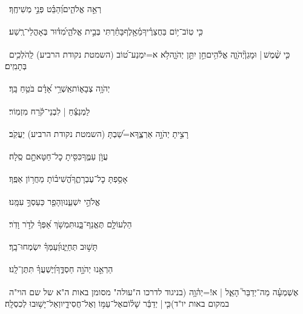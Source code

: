 \documentclass[12pt]{article}
\newcommand{\loc}[1]{\textsuperscript{\locf{#1}}}
\begin{document}
{\loc{ י}~}‏ רְאֵ֣ה אֱלֹהִ֑ים{\hfill}וְ֝הַבֵּ֗ט פְּנֵ֣י מְשִׁיחֶֽךָ׃\par

{\loc{ יא}~}‏כִּ֤י טֽוֹב־י֥וֹם בַּחֲצֵרֶ֗יךָ{\hfill}מֵ֫אָ֥לֶף\newline\hspace*{.5em}בָּחַ֗רְתִּי  בְּבֵ֣ית אֱלֹהַ֑י{\hfill}מִ֝דּ֗וּר בְּאָהֳלֵי־רֶֽשַׁע׃\par

{\loc{ יב}~}‏כִּ֤י שֶׁ֨מֶשׁ |  וּמָגֵן֮{\hfill}יְהֹוָ֢ה אֱלֹ֫הִ֥ים\newline\hspace*{.5em}חֵ֣ן  יִתֵּ֣ן יְהֹוָ֑ה{\hfill}לֹ֥א א=יִמְנַע־ט֝וֹב (השמטת נקודת הרביע) לַֽהֹלְכִ֥ים בְּתָמִֽים׃\par

{\loc{ יג}~}‏יְהֹוָ֥ה צְבָא֑וֹת{\hfill}אַֽשְׁרֵ֥י אָ֝דָ֗ם בֹּטֵ֥חַ בָּֽךְ׃\par\pend
\ledpb
\pstart[\subsection*{\textcolor{red}{פרק פה}}]\label{פרק פה}
{\loc{ א}~}‏לַמְנַצֵּ֬חַ | לִבְנֵי־קֹ֬רַח מִזְמֽוֹר׃\par

{\loc{ ב}~}‏רָצִ֣יתָ יְהֹוָ֣ה אַרְצֶ֑ךָ{\hfill}א=שַׁ֝בְתָּ (השמטת נקודת הרביע)  יַעֲקֹֽב׃\par

{\loc{ ג}~}‏ עֲוֺ֣ן עַמֶּ֑ךָ{\hfill}כִּסִּ֖יתָ כׇל־חַטָּאתָ֣ם סֶֽלָה׃\par

{\loc{ ד}~}‏אָסַ֥פְתָּ כׇל־עֶבְרָתֶ֑ךָ{\hfill}הֱ֝שִׁיב֗וֹתָ מֵחֲר֥וֹן אַפֶּֽךָ׃\par

{\loc{ ה}~}‏ אֱלֹהֵ֣י יִשְׁעֵ֑נוּ{\hfill}וְהָפֵ֖ר כַּעַסְךָ֣ עִמָּֽנוּ׃\par

{\loc{ ו}~}‏הַלְעוֹלָ֥ם תֶּאֱנַף־בָּ֑נוּ{\hfill}תִּמְשֹׁ֥ךְ אַ֝פְּךָ֗ לְדֹ֣ר וָדֹֽר׃\par

{\loc{ ז}~}‏ תָּשׁ֣וּב תְּחַיֵּ֑נוּ{\hfill}וְ֝עַמְּךָ֗ יִשְׂמְחוּ־בָֽךְ׃\par

{\loc{ ח}~}‏הַרְאֵ֣נוּ יְהֹוָ֣ה חַסְדֶּ֑ךָ{\hfill}וְ֝יֶשְׁעֲךָ֗ תִּתֶּן־לָֽנוּ׃\par

{\loc{ ט}~}‏אֶשְׁמְעָ֗ה מַה־יְדַבֵּר֮ הָאֵ֢ל | א!=יְה֫וָ֥ה (בניגוד לדרכו ה"עולה" מסומן באות ה"א של שם הוי"ה במקום באות יו"ד){\hfill}כִּ֤י |  יְדַבֵּ֬ר שָׁל֗וֹם\newline\hspace*{.5em}אֶל־עַמּ֥וֹ וְאֶל־חֲסִידָ֑יו{\hfill}וְאַל־יָשׁ֥וּבוּ לְכִסְלָֽה׃\par
\end{document}

